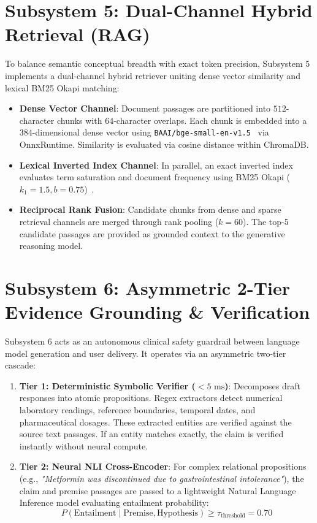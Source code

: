 \section{Subsystem 5: Dual-Channel Hybrid Retrieval (RAG)}
\label{sec:impl_subsystem_rag}

To balance semantic conceptual breadth with exact token precision, Subsystem 5 implements a dual-channel hybrid retriever uniting dense vector similarity and lexical BM25 Okapi matching:
\begin{itemize}
    \item \textbf{Dense Vector Channel}: Document passages are partitioned into $512$-character chunks with $64$-character overlaps. Each chunk is embedded into a $384$-dimensional dense vector using \texttt{BAAI/bge-small-en-v1.5}~\cite{xiao2023bge} via OnnxRuntime. Similarity is evaluated via cosine distance within ChromaDB.
    \item \textbf{Lexical Inverted Index Channel}: In parallel, an exact inverted index evaluates term saturation and document frequency using BM25 Okapi ($k_1=1.5, b=0.75$)~\cite{robertson2009bm25}.
    \item \textbf{Reciprocal Rank Fusion}: Candidate chunks from dense and sparse retrieval channels are merged through rank pooling ($k=60$). The top-5 candidate passages are provided as grounded context to the generative reasoning model.
\end{itemize}


\section{Subsystem 6: Asymmetric 2-Tier Evidence Grounding \& Verification}
\label{sec:impl_subsystem_verification}

Subsystem 6 acts as an autonomous clinical safety guardrail between language model generation and user delivery. It operates via an asymmetric two-tier cascade:
\begin{enumerate}
    \item \textbf{Tier 1: Deterministic Symbolic Verifier ($<5\text{ ms}$)}: Decomposes draft responses into atomic propositions. Regex extractors detect numerical laboratory readings, reference boundaries, temporal dates, and pharmaceutical dosages. These extracted entities are verified against the source text passages. If an entity matches exactly, the claim is verified instantly without neural compute.
    \item \textbf{Tier 2: Neural NLI Cross-Encoder}: For complex relational propositions (e.g., \textit{"Metformin was discontinued due to gastrointestinal intolerance"}), the claim and premise passages are passed to a lightweight Natural Language Inference model evaluating entailment probability:
    \begin{equation}
        P(\text{Entailment} \mid \text{Premise}, \text{Hypothesis}) \ge \tau_{\text{threshold}} = 0.70
    \end{equation}
\end{enumerate}

